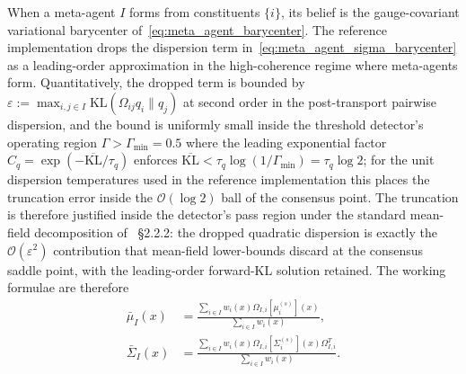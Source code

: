 \documentclass[11pt]{article}
\begin{document}
When a meta-agent $I$ forms from constituents $\{i\}$, its belief is the gauge-covariant variational barycenter of~\eqref{eq:meta_agent_barycenter}. The reference implementation drops the dispersion term in~\eqref{eq:meta_agent_sigma_barycenter} as a leading-order approximation in the high-coherence regime where meta-agents form. Quantitatively, the dropped term is bounded by $\varepsilon := \max_{i,j \in I} \mathrm{KL}(\Omega_{ij}q_i \| q_j)$ at second order in the post-transport pairwise dispersion, and the bound is uniformly small inside the threshold detector's operating region $\Gamma > \Gamma_{\min} = 0.5$ where the leading exponential factor $C_q = \exp(-\overline{\mathrm{KL}}/\tau_q)$ enforces $\overline{\mathrm{KL}} < \tau_q \log(1/\Gamma_{\min}) = \tau_q \log 2$; for the unit dispersion temperatures used in the reference implementation this places the truncation error inside the $\mathcal{O}(\log 2)$ ball of the consensus point. The truncation is therefore justified inside the detector's pass region under the standard mean-field decomposition of~\cite{Beal2003} §2.2.2: the dropped quadratic dispersion is exactly the $\mathcal{O}(\varepsilon^2)$ contribution that mean-field lower-bounds discard at the consensus saddle point, with the leading-order forward-KL solution retained. The working formulae are therefore
\begin{align}
\bar{\mu}_I(x) &= \frac{\sum_{i \in I} w_i(x)  \Omega_{I,i}[\mu_i^{(s)}](x)}{\sum_{i \in I} w_i(x)},
\label{eq:meta_agent_mu_impl}
\\
\bar{\Sigma}_I(x) &= \frac{\sum_{i \in I} w_i(x)  \Omega_{I,i}[\Sigma_i^{(s)}](x)  \Omega_{I,i}^T}{\sum_{i \in I} w_i(x)}.
\label{eq:meta_agent_sigma_impl}
\end{align}
\end{document}
